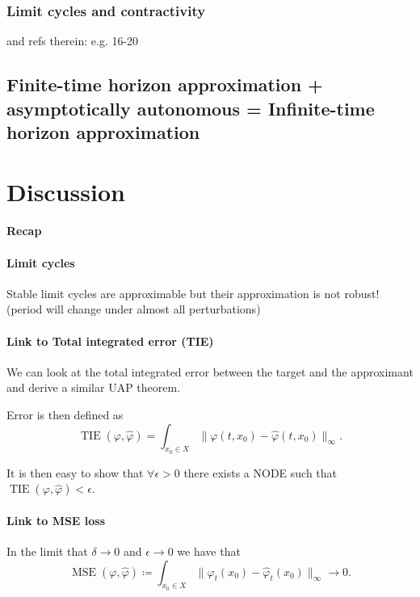 \documentclass{article}
\theoremstyle{definition}
\theoremstyle{remark}
\newcounter{ct}
\begin{document}
\subsubsection{Limit cycles and contractivity}
\citep{manchester2014transverse} and refs therein: e.g. 16-20



\subsection{Finite-time horizon approximation + asymptotically autonomous = Infinite-time horizon approximation}









\section{Discussion}
\paragraph{Recap}	


\paragraph{Limit cycles}
Stable limit cycles are approximable but their approximation is not robust! (period will change under almost all perturbations)


\paragraph{Link to Total integrated error (TIE)}
We can look at the total integrated error between the target and the approximant and derive a similar UAP theorem.

Error is then defined as 
\begin{equation}
\operatorname{TIE}(\varphi, \hat{\varphi}) = \int_{x_0\in X}\|\varphi(t,x_0) - \hat{\varphi}(t, x_0)\|_\infty.
\end{equation}

It is then easy to show that $\forall\epsilon>0$ there exists a NODE such that $\operatorname{TIE}(\varphi, \hat{\varphi})<\epsilon$.

\paragraph{Link to MSE loss}
In the limit that $\delta\rightarrow 0$ and $\epsilon\rightarrow 0$  we have that 
\[\operatorname{MSE}(\varphi, \hat{\varphi}) \coloneqq \int_{x_0\in X} \|\varphi_t(x_0) - \hat{\varphi}_t(x_0)\|_\infty \rightarrow 0.\]
\end{document}
